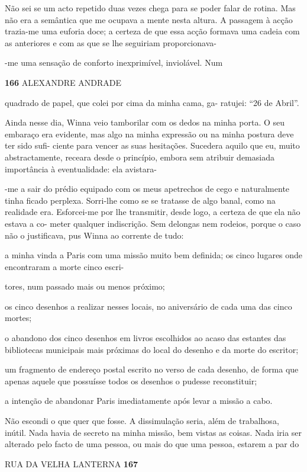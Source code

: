 Não sei se um acto repetido duas vezes chega para se poder falar de
rotina. Mas não era a semântica que me ocupava a mente nesta altura. A
passagem à acção trazia-me uma euforia doce; a certeza de que essa acção
formava uma cadeia com as anteriores e com as que se lhe seguiriam
proporcionava-

-me uma sensação de conforto inexprimível, inviolável. Num

\textbf{166 }ALEXANDRE ANDRADE

quadrado de papel, que colei por cima da minha cama, ga- ratujei: ``26
de Abril''.

Ainda nesse dia, Winna veio tamborilar com os dedos na minha porta. O
seu embaraço era evidente, mas algo na minha expressão ou na minha
postura deve ter sido sufi- ciente para vencer as suas hesitações.
Sucedera aquilo que eu, muito abstractamente, receara desde o princípio,
embora sem atribuir demasiada importância à eventualidade: ela avistara-

-me a sair do prédio equipado com os meus apetrechos de cego e
naturalmente tinha ficado perplexa. Sorri-lhe como se se tratasse de
algo banal, como na realidade era. Esforcei-me por lhe transmitir, desde
logo, a certeza de que ela não estava a co- meter qualquer indiscrição.
Sem delongas nem rodeios, porque o caso não o justificava, pus Winna ao
corrente de tudo:

a minha vinda a Paris com uma missão muito bem definida; os cinco
lugares onde encontraram a morte cinco escri-

tores, num passado mais ou menos próximo;

os cinco desenhos a realizar nesses locais, no aniversário de cada uma
das cinco mortes;

o abandono dos cinco desenhos em livros escolhidos ao acaso das estantes
das bibliotecas municipais mais próximas do local do desenho e da morte
do escritor;

um fragmento de endereço postal escrito no verso de cada desenho, de
forma que apenas aquele que possuísse todos os desenhos o pudesse
reconstituir;

a intenção de abandonar Paris imediatamente após levar a missão a cabo.

Não escondi o que quer que fosse. A dissimulação seria, além de
trabalhosa, inútil. Nada havia de secreto na minha missão, bem vistas as
coisas. Nada iria ser alterado pelo facto de uma pessoa, ou mais do que
uma pessoa, estarem a par do

RUA DA VELHA LANTERNA \textbf{167}


